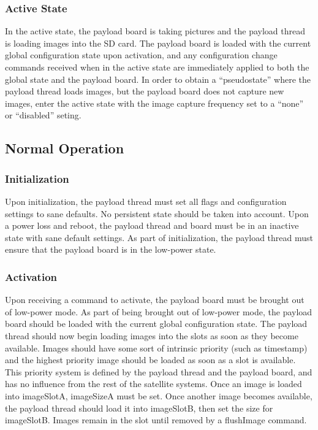 \documentclass{article}
\begin{document}
\subsubsection{Active State}
In the active state, the payload board is taking pictures and the payload thread
is loading images into the SD card. The payload board is loaded with the current
global configuration state upon activation, and any configuration change
commands received when in the active state are immediately applied to both
the global state and the payload board.
In order to obtain a 
``pseudostate'' where the payload thread loads images, but the payload board
does not capture new images, enter the active state with the image capture
frequency set to a ``none'' or ``disabled'' seting.

\subsection{Normal Operation}
\subsubsection{Initialization}
Upon initialization, the payload thread must set all flags and configuration
settings to sane defaults. No persistent state should be taken into account. Upon
a power loss and reboot, the payload thread and board must be in an inactive state
with sane default settings. As part of initialization, the payload thread must
ensure that the payload board is in the low-power state.

\subsubsection{Activation}
Upon receiving a command to activate, the payload board must
be brought out of low-power mode. As part of being brought out of low-power
mode, the payload board should be loaded with the current global configuration
state. The payload thread should now begin loading 
images into the slots as soon as they become available. Images should have some
sort of intrinsic priority (such as timestamp) and the highest priority image
should be loaded as soon as a slot is available. This priority system is defined
by the payload thread and the payload board, and has no influence from the
rest of the satellite systems. Once an image is loaded into
imageSlotA, imageSizeA must be set. Once another image becomes available, 
the payload thread should load it into imageSlotB, then set the size for
imageSlotB. Images remain in the slot until removed by a flushImage command.
\end{document}
